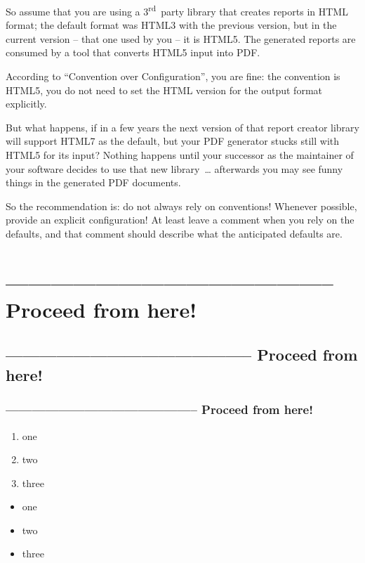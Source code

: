 So assume that you are using a 3\textsuperscript{rd}~party library that creates reports in HTML format; the default format was HTML3 with the previous version, but in the current version – that one used by you – it is HTML5. The generated reports are consumed by a tool that converts HTML5 input into PDF.

According to “Convention over Configuration”, you are fine: the convention is HTML5, you do not need to set the HTML version for the output format explicitly.

But what happens, if in a few years the next version of that report creator library will support HTML7 as the default, but your PDF generator stucks still with HTML5 for its input? Nothing happens until your successor as the maintainer of your software decides to use that new library~… afterwards you may see funny things in the generated PDF documents.

So the recommendation is: do not always rely on conventions! Whenever possible, provide an explicit configuration! At least leave a comment when you rely on the defaults, and that comment should describe what the anticipated defaults are.

\hrulefill\newpage 
\section{-------------------------------------------- Proceed from here!}
\subsection{-------------------------------------------- Proceed from here!}
\subsubsection{-------------------------------------------- Proceed from here!}
\autocite{APIGUARDIAN}
\autocite{APIGUARDIAN:API}
\lipsum[1]

\begin{enumerate}[label=P\arabic*.]
\item{one}
\item{two}
\item{three}
\end{enumerate}

\begin{itemize}[nosep]
\item{one}
\item{two}
\item{three}
\end{itemize}

